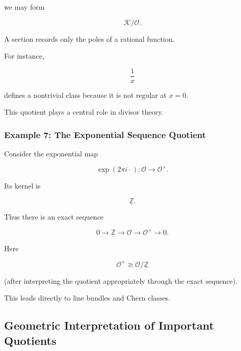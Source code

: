 \documentclass[12pt,a4paper]{article}
\theoremstyle{notespace}
\begin{document}
we may form

\[
\mathcal K/\mathcal O.
\]

A section records only the poles of a rational function.

For instance,

\[
\frac1x
\]

defines a nontrivial class because it is not regular at \(x=0\).

This quotient plays a central role in divisor theory.

\bigskip

\subsubsection*{Example 7: The Exponential Sequence Quotient}

Consider the exponential map

\[
\exp(2\pi i\cdot):
\mathcal O
\to
\mathcal O^\times.
\]

Its kernel is

\[
\underline{\mathbb Z}.
\]

Thus there is an exact sequence

\[
0
\to
\underline{\mathbb Z}
\to
\mathcal O
\to
\mathcal O^\times
\to
0.
\]

Here

\[
\mathcal O^\times
\cong
\mathcal O/\underline{\mathbb Z}
\]

(after interpreting the quotient appropriately through the exact sequence).

This leads directly to line bundles and Chern classes.

\bigskip

\subsection{Geometric Interpretation of Important Quotients}
\end{document}
